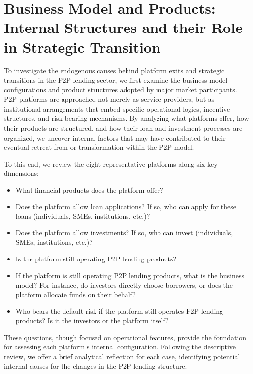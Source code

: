 \documentclass[pdflatex,sn-apa]{sn-jnl}%
\theoremstyle{thmstyleone}%
\theoremstyle{thmstyletwo}%
\theoremstyle{thmstylethree}%
\begin{document}
\section{Business Model and Products: Internal Structures and their Role in Strategic Transition}
\label{sec: internal_factors}

To investigate the endogenous causes behind platform exits and strategic transitions in the P2P lending sector, we first examine the business model configurations and product structures adopted by major market participants. P2P platforms are approached not merely as service providers, but as institutional arrangements that embed specific operational logics, incentive structures, and risk-bearing mechanisms. By analyzing what platforms offer, how their products are structured, and how their loan and investment processes are organized, we uncover internal factors that may have contributed to their eventual retreat from or transformation within the P2P model.

To this end, we review the eight representative platforms along six key dimensions: 
\begin{itemize} 
\item What financial products does the platform offer? 
\item Does the platform allow loan applications? If so, who can apply for these loans (individuals, SMEs, institutions, etc.)? 
\item Does the platform allow investments? If so, who can invest (individuals, SMEs, institutions, etc.)? 
\item Is the platform still operating P2P lending products?  
\item If the platform is still operating P2P lending products, what is the business model? For instance, do investors directly choose borrowers, or does the platform allocate funds on their behalf? 
\item Who bears the default risk if the platform still operates P2P lending products? Is it the investors or the platform itself? 
\end{itemize}

These questions, though focused on operational features, provide the foundation for assessing each platform’s internal configuration. Following the descriptive review, we offer a brief analytical reflection for each case, identifying potential internal causes for the changes in the P2P lending structure. 
\end{document}
